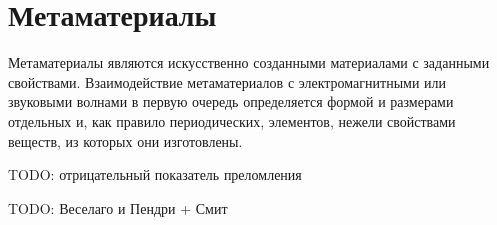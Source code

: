 \section{Метаматериалы}

Метаматериалы являются искусственно созданными материалами с заданными свойствами. Взаимодействие метаматериалов с электромагнитными или звуковыми \cite{Zhang2009} волнами в первую очередь определяется формой и размерами отдельных и, как правило периодических, элементов, нежели свойствами веществ, из которых они изготовлены.

TODO: отрицательный показатель преломления

TODO: Веселаго \cite{Veselago1967} и Пендри + Смит \cite{Pendry2000}